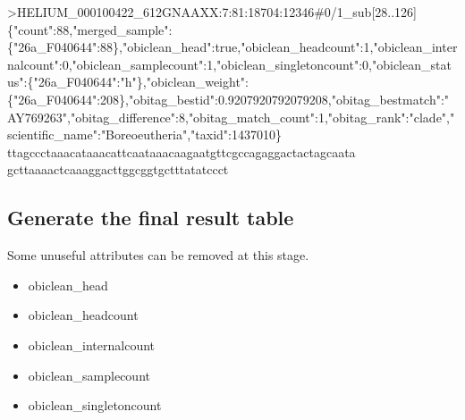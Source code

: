 \documentclass[
  letterpaper,
  DIV=11,
  numbers=noendperiod]{scrreprt}
\newenvironment{Shaded}{\begin{snugshade}}{\end{snugshade}}
\newcommand{\DataTypeTok}[1]{\textcolor[rgb]{0.68,0.00,0.00}{#1}}
\newcommand{\ExtensionTok}[1]{\textcolor[rgb]{0.00,0.23,0.31}{#1}}
\newcommand{\NormalTok}[1]{\textcolor[rgb]{0.00,0.23,0.31}{#1}}
\newcommand{\OperatorTok}[1]{\textcolor[rgb]{0.37,0.37,0.37}{#1}}
\newcommand{\StringTok}[1]{\textcolor[rgb]{0.13,0.47,0.30}{#1}}
\providecommand{\tightlist}{%
  \setlength{\itemsep}{0pt}\setlength{\parskip}{0pt}}\usepackage{longtable,booktabs,array}
\begin{document}
\begin{Shaded}
\begin{Highlighting}[]
\OperatorTok{\textgreater{}}\NormalTok{HELIUM\_000100422\_612GNAAXX:7:81:18704:12346\#0/1\_sub[28..126] }\DataTypeTok{\{}\StringTok{"count"}\DataTypeTok{:88}\OperatorTok{,}\StringTok{"merged\_sample"}\DataTypeTok{:\{}\StringTok{"26a\_F040644"}\DataTypeTok{:88\}}\OperatorTok{,}\StringTok{"obiclean\_head"}\DataTypeTok{:true}\OperatorTok{,}\StringTok{"obiclean\_headcount"}\DataTypeTok{:1}\OperatorTok{,}\StringTok{"obiclean\_internalcount"}\DataTypeTok{:0}\OperatorTok{,}\StringTok{"obiclean\_samplecount"}\DataTypeTok{:1}\OperatorTok{,}\StringTok{"obiclean\_singletoncount"}\DataTypeTok{:0}\OperatorTok{,}\StringTok{"obiclean\_status"}\DataTypeTok{:\{}\StringTok{"26a\_F040644"}\DataTypeTok{:}\StringTok{"h"}\DataTypeTok{\}}\OperatorTok{,}\StringTok{"obiclean\_weight"}\DataTypeTok{:\{}\StringTok{"26a\_F040644"}\DataTypeTok{:208\}}\OperatorTok{,}\StringTok{"obitag\_bestid"}\DataTypeTok{:0.9207920792079208}\OperatorTok{,}\StringTok{"obitag\_bestmatch"}\DataTypeTok{:}\StringTok{"AY769263"}\OperatorTok{,}\StringTok{"obitag\_difference"}\DataTypeTok{:8}\OperatorTok{,}\StringTok{"obitag\_match\_count"}\DataTypeTok{:1}\OperatorTok{,}\StringTok{"obitag\_rank"}\DataTypeTok{:}\StringTok{"clade"}\OperatorTok{,}\StringTok{"scientific\_name"}\DataTypeTok{:}\StringTok{"Boreoeutheria"}\OperatorTok{,}\StringTok{"taxid"}\DataTypeTok{:1437010\}}
\ExtensionTok{ttagccctaaacataaacattcaataaacaagaatgttcgccagaggactactagcaata}
\ExtensionTok{gcttaaaactcaaaggacttggcggtgctttatatccct}
\end{Highlighting}
\end{Shaded}

\hypertarget{generate-the-final-result-table}{%
\subsection{Generate the final result
table}\label{generate-the-final-result-table}}

Some unuseful attributes can be removed at this stage.

\begin{itemize}
\tightlist
\item
  obiclean\_head
\item
  obiclean\_headcount
\item
  obiclean\_internalcount
\item
  obiclean\_samplecount
\item
  obiclean\_singletoncount
\end{itemize}
\end{document}
